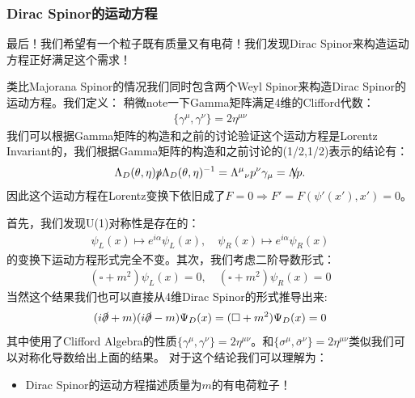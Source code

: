 \subsubsection{Dirac Spinor的运动方程}
最后！我们希望有一个粒子既有质量又有电荷！我们发现Dirac Spinor来构造运动方程正好满足这个需求！

\bigskip
{}

类比Majorana Spinor的情况我们同时包含两个Weyl Spinor来构造Dirac Spinor的运动方程。我们定义：
稍微note一下Gamma矩阵满足4维的Clifford代数：
\begin{align}
  \{\gamma^\mu,\gamma^\nu\}=2\eta^{\mu\nu}
\end{align}
我们可以根据Gamma矩阵的构造和之前的讨论验证这个运动方程是Lorentz Invariant的，我们根据Gamma矩阵的构造和之前讨论的(1/2,1/2)表示的结论有：
\begin{align}
  \Lambda_D(\theta,\eta)\slashed{p}\Lambda_D(\theta,\eta)^{-1}=\Lambda^\mu{}_\nu p^\nu\gamma_\mu=\slashed{\Lambda p}.
\end{align}
因此这个运动方程在Lorentz变换下依旧成了$ F = 0 \Rightarrow F' = F(\psi'(x'),x') = 0 $。


首先，我们发现U(1)对称性是存在的：
\begin{align}
  \psi_L(x)\mapsto e^{i\alpha}\psi_L(x), \quad \psi_R(x)\mapsto e^{i\alpha}\psi_R(x)
\end{align}
的变换下运动方程形式完全不变。其次，我们考虑二阶导数形式：
\begin{align}
  (\square + m^2)\psi_L(x)=0, \quad (\square + m^2)\psi_R(x)=0
\end{align}
当然这个结果我们也可以直接从4维Dirac Spinor的形式推导出来:
\begin{align}
  (i\slashed{\partial}+m)(i\slashed{\partial}-m)\Psi_D(x)=(\square + m^2)\Psi_D(x)=0
\end{align}
其中使用了Clifford Algebra的性质$ \{\gamma^\mu,\gamma^\nu\}=2\eta^{\mu\nu} $。和$ \{\sigma^\mu,\bar{\sigma}^\nu\}=2\eta^{\mu\nu} $类似我们可以对称化导数给出上面的结果。
对于这个结论我们可以理解为：
\begin{itemize}
  \item Dirac Spinor的运动方程描述质量为$ m $的有电荷粒子！
\end{itemize}
\bigskip

